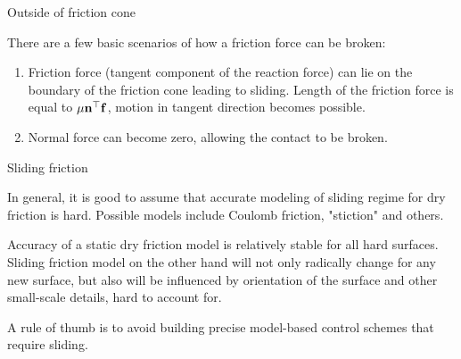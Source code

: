 \documentclass{beamer}
\begin{document}
\begin{frame}{Outside of friction cone}
	\begin{flushleft}
		
		There are a few basic scenarios of how a friction force can be broken:
		
		\begin{enumerate}
			\item Friction force (tangent component of the reaction force) can lie on the boundary of the friction cone leading to sliding. Length of the friction force is equal to $\mu \mathbf{n}^\top \mathbf{f}$, motion in tangent direction becomes possible.
			
			\item Normal force can become zero, allowing the contact to be broken.
		\end{enumerate}
	
	\end{flushleft}
\end{frame}




\begin{frame}{Sliding friction}
	\begin{flushleft}
		
		In general, it is good to assume that accurate modeling of sliding regime for dry friction is hard. Possible models include Coulomb friction, "stiction" and others.
		
		\bigskip
		
		Accuracy of a static dry friction model is relatively stable for all hard surfaces. Sliding friction model on the other hand will not only radically change for any new surface, but also will be influenced by orientation of the surface and other small-scale details, hard to account for.
		
		\bigskip
		
		A rule of thumb is to avoid building precise model-based control schemes that require sliding.
		
	\end{flushleft}
\end{frame}
\end{document}
